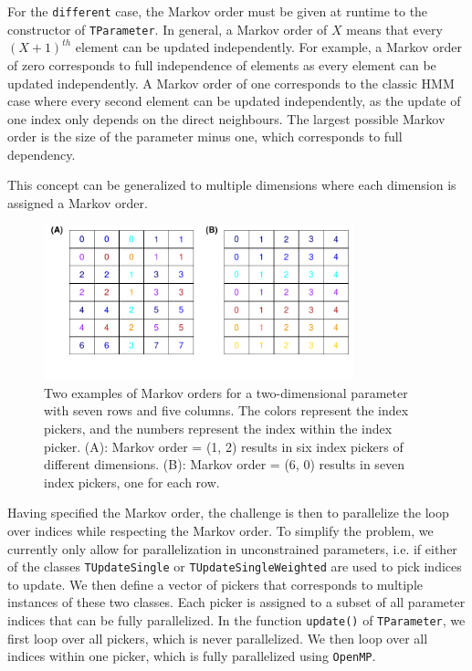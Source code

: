 \documentclass[a4paper,11pt]{article}
\newcommand{\class}[1]{\texttt{#1}}
\newcommand{\pubfunc}[1]{\texttt{#1()}}
\newcommand{\type}[1]{\texttt{#1}}
\begin{document}
For the \type{different} case, the Markov order must be given at runtime to the constructor of \class{TParameter}. In general, a Markov order of $X$ means that every $(X+1)^{th}$ element can be updated independently. For example, a Markov order of zero corresponds to full independence of elements as every element can be updated independently. A Markov order of one corresponds to the classic HMM case where every second element can be updated independently, as the update of one index only depends on the direct neighbours. The largest possible Markov order is the size of the parameter minus one, which corresponds to full dependency.

This concept can be generalized to multiple dimensions where each dimension is assigned a Markov order.

\begin{figure}[t]
\begin{center}
\includegraphics[width=0.8\textwidth]{Figures/picker.pdf}
\end{center}
\caption{Two examples of Markov orders for a two-dimensional parameter with seven rows and five columns. The colors represent the index pickers, and the numbers represent the index within the index picker. (A): Markov order = (1, 2) results in six index pickers of different dimensions. (B): Markov order = (6, 0) results in seven index pickers, one for each row.}
\label{fig:picker}
\end{figure}

Having specified the Markov order, the challenge is then to parallelize the loop over indices while respecting the Markov order. To simplify the problem, we currently only allow for parallelization in unconstrained parameters, i.e. if either of the classes \class{TUpdateSingle} or \class{TUpdateSingleWeighted} are used to pick indices to update. We then define a vector of pickers that corresponds to multiple instances of these two classes. Each picker is assigned to a subset of all parameter indices that can be fully parallelized. In the function \pubfunc{update} of \class{TParameter}, we first loop over all pickers, which is never parallelized. We then loop over all indices within one picker, which is fully parallelized using \texttt{OpenMP}.
\end{document}
